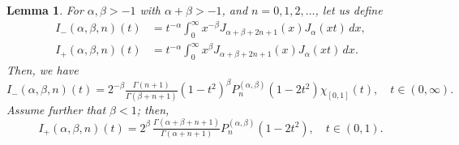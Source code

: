 \documentclass[11pt,a4paper]{amsart}
\theoremstyle{plain}
\newtheorem{Lem}{Lemma}%
\theoremstyle{definition}
\begin{document}
\begin{Lem}
\label{lem:HTjnab}
For $\alpha,\beta>-1$ with $\alpha+ \beta> -1$,
and $n = 0,1,2,\dots$, let us define
\begin{align*}
  I_{-}(\alpha,\beta,n)(t) &= t^{-\alpha}
    \int_0^\infty x^{-\beta} J_{\alpha+\beta+2n+1}(x) J_\alpha(xt)\, dx, \\
  I_{+}(\alpha,\beta,n)(t) &= t^{-\alpha}
    \int_0^\infty x^{\beta} J_{\alpha+\beta+2n+1}(x) J_\alpha(xt)\, dx.
\end{align*}
Then, we have
\begin{equation}
\label{eq:HTjnab}
  I_{-}(\alpha,\beta,n)(t)
  = 2^{-\beta} \tfrac{\Gamma(n+1)}{\Gamma(\beta+n+1)} (1-t^2)^\beta
  P^{(\alpha,\beta)}_n(1-2t^2) \chi_{[0,1]}(t), \quad t \in (0,\infty).
\end{equation}
Assume further that $\beta<1$; then,
\begin{equation}
\label{eq:HTbjnab}
  I_{+}(\alpha,\beta,n)(t)
  = 2^\beta\, \tfrac{\Gamma(\alpha+\beta+n+1)} {\Gamma(\alpha+n+1)}
  P^{(\alpha,\beta)}_n(1-2t^2), \quad t \in (0,1).
\end{equation}
\end{Lem}
\end{document}
